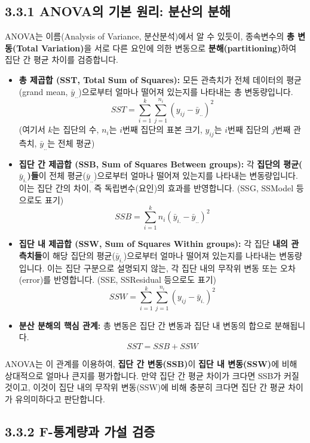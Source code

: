 \documentclass[
  letterpaper,
]{book}
\begin{document}
\subsection{3.3.1 ANOVA의 기본 원리: 분산의
분해}\label{anovauxc758-uxae30uxbcf8-uxc6d0uxb9ac-uxbd84uxc0b0uxc758-uxbd84uxd574}

ANOVA는 이름(Analysis of Variance, 분산분석)에서 알 수 있듯이,
종속변수의 \textbf{총 변동(Total Variation)}을 서로 다른 요인에 의한
변동으로 \textbf{분해(partitioning)}하여 집단 간 평균 차이를 검증합니다.

\begin{itemize}
\item
  \textbf{총 제곱합 (SST, Total Sum of Squares):} 모든 관측치가 전체
  데이터의 평균(grand mean, \(\bar{y}_{..}\))으로부터 얼마나 떨어져
  있는지를 나타내는 총 변동량입니다.
  \[SST = \sum_{i=1}^{k}\sum_{j=1}^{n_i}(y_{ij} - \bar{y}_{..})^2\]
  (여기서 \(k\)는 집단의 수, \(n_i\)는 \(i\)번째 집단의 표본 크기,
  \(y_{ij}\)는 \(i\)번째 집단의 \(j\)번째 관측치, \(\bar{y}_{..}\)는
  전체 평균)
\item
  \textbf{집단 간 제곱합 (SSB, Sum of Squares Between groups):} 각
  \textbf{집단의 평균(\(\bar{y}_{i.}\))들}이 전체
  평균(\(\bar{y}_{..}\))으로부터 얼마나 떨어져 있는지를 나타내는
  변동량입니다. 이는 집단 간의 차이, 즉 독립변수(요인)의 효과를
  반영합니다. (SSG, SSModel 등으로도 표기)
  \[SSB = \sum_{i=1}^{k} n_i (\bar{y}_{i.} - \bar{y}_{..})^2\]
\item
  \textbf{집단 내 제곱합 (SSW, Sum of Squares Within groups):} 각 집단
  \textbf{내의 관측치들}이 해당 집단의 평균(\(\bar{y}_{i.}\))으로부터
  얼마나 떨어져 있는지를 나타내는 변동량입니다. 이는 집단 구분으로
  설명되지 않는, 각 집단 내의 무작위 변동 또는 오차(error)를 반영합니다.
  (SSE, SSResidual 등으로도 표기)
  \[SSW = \sum_{i=1}^{k}\sum_{j=1}^{n_i}(y_{ij} - \bar{y}_{i.})^2\]
\item
  \textbf{분산 분해의 핵심 관계:} 총 변동은 집단 간 변동과 집단 내
  변동의 합으로 분해됩니다. \[SST = SSB + SSW\]
\end{itemize}

ANOVA는 이 관계를 이용하여, \textbf{집단 간 변동(SSB)}이 \textbf{집단 내
변동(SSW)}에 비해 상대적으로 얼마나 큰지를 평가합니다. 만약 집단 간 평균
차이가 크다면 SSB가 커질 것이고, 이것이 집단 내의 무작위 변동(SSW)에
비해 충분히 크다면 집단 간 평균 차이가 유의미하다고 판단합니다.

\subsection{3.3.2 F-통계량과 가설
검증}\label{f-uxd1b5uxacc4uxb7c9uxacfc-uxac00uxc124-uxac80uxc99d}
\end{document}
